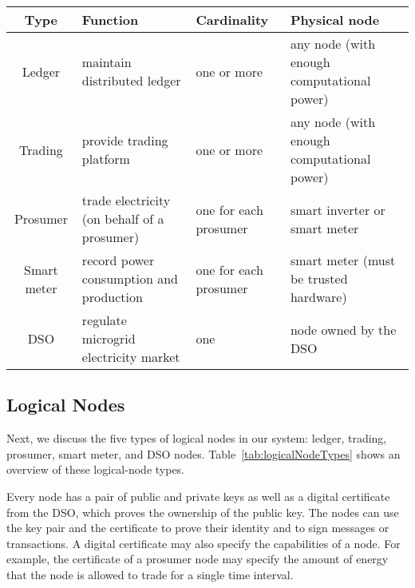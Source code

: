 \documentclass[sigconf]{acmart}
\begin{document}
\begin{figure*}
\begin{tikzpicture}[
  x=1cm, 
  y=1cm,
  nodeStyle/.style={fill=white, draw=black, drop shadow=black!30, minimum size=0.5cm}]
\end{tikzpicture}
\caption{High-level logical architecture of the trading platform and the distributed ledger. A physical node may implement multiple logical nodes.}
\label{fig:logicalNodeArchitecture}
\end{figure*}


\begin{table*}
\caption{Logical Node Types}
\label{tab:logicalNodeTypes}
\begin{tabular}{|c||l|l|l|}
\hline
\textbf{Type} & \textbf{Function} & \textbf{Cardinality} & \textbf{Physical node} \\
\hline\hline
\rowcolor{Gray} Ledger      & maintain distributed ledger                 & one or more           & any node (with enough computational power) \\ \hline
                Trading     & provide trading platform                    & one or more           & any node (with enough computational power) \\ \hline
\rowcolor{Gray} Prosumer    & trade electricity (on behalf of a prosumer) & one for each prosumer & smart inverter or smart meter \\ \hline
                Smart meter & record power consumption and production     & one for each prosumer & smart meter (must be trusted hardware) \\ \hline
\rowcolor{Gray} DSO         & regulate microgrid electricity market       & one                   & node owned by the DSO \\ \hline
\end{tabular}
\end{table*}

\subsection{Logical Nodes}

Next, we discuss the five types of logical nodes in our system: ledger, trading, prosumer, smart meter, and DSO nodes.
Table~\ref{tab:logicalNodeTypes} shows an overview of these logical-node types.

Every node has a pair of public and private keys as well as a digital certificate from the DSO, which proves the ownership of the public key.
The nodes can use the key pair and the certificate to prove their identity and to sign messages or transactions.
A digital certificate may also specify the capabilities of a node.
For example, the certificate of a prosumer node may specify the amount of energy that the node is allowed to trade for a single time interval.
\end{document}
